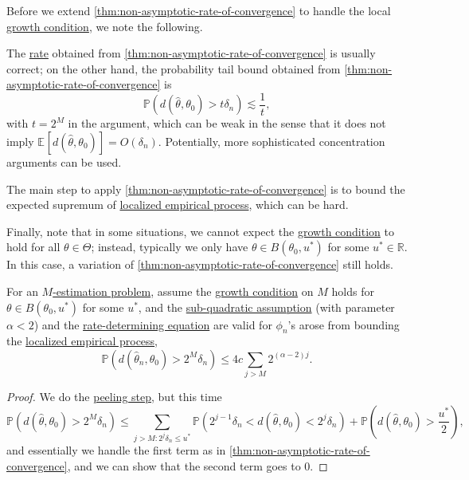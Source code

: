 Before we extend \autoref{thm:non-asymptotic-rate-of-convergence} to handle the local \hyperref[def:growth-condition*]{growth condition}, we note the following.

\begin{remark}
	The \hyperref[def:rate-of-convergence]{rate} obtained from \autoref{thm:non-asymptotic-rate-of-convergence} is usually correct; on the other hand, the probability tail bound obtained from \autoref{thm:non-asymptotic-rate-of-convergence} is
	\[
		\mathbb{P} (d(\hat{\theta} , \theta _0) > t \delta _n) \lesssim \frac{1}{t},
	\]
	with \(t = 2^M\) in the argument, which can be weak in the sense that it does not imply \(\mathbb{E}_{}[d(\hat{\theta} , \theta _0) ] = O(\delta _n)\). Potentially, more sophisticated concentration arguments can be used.
\end{remark}

\begin{remark}
	The main step  to apply \autoref{thm:non-asymptotic-rate-of-convergence} is to bound the expected supremum of \hyperref[def:localized-EP]{localized empirical process}, which can be hard.
\end{remark}

Finally, note that in some situations, we cannot expect the \hyperref[def:growth-condition*]{growth condition} to hold for all \(\theta \in \Theta \); instead, typically we only have \(\theta \in B(\theta _0, u^{\ast} )\) for some \(u^{\ast} \in \mathbb{R} \). In this case, a variation of \autoref{thm:non-asymptotic-rate-of-convergence} still holds.

\begin{theorem}\label{thm:non-asymptotic-rate-of-convergence-extend}
	For an \hyperref[prb:M-estimation]{\(M\)-estimation problem}, assume the \hyperref[def:growth-condition*]{growth condition} on \(M\) holds for \(\theta \in B(\theta _0, u^{\ast} )\) for some \(u^{\ast} \), and the \hyperref[def:sub-quadratic-assumption]{sub-quadratic assumption} (with parameter \(\alpha < 2\)) and the \hyperref[def:rate-determining-equation]{rate-determining equation} are valid for \(\phi _n\)'s arose from bounding the \hyperref[def:localized-EP]{localized empirical process},
	\[
		\mathbb{P} (d(\hat{\theta} _n, \theta _0) > 2^M \delta _n) \leq 4c \sum_{j > M} 2^{(\alpha -2) j}.
	\]
\end{theorem}
\begin{proof}
	We do the \hyperref[eq:peeling-step]{peeling step}, but this time
	\[
		\mathbb{P} (d(\hat{\theta} , \theta _0) > 2^M \delta _n)
		\leq \sum_{j > M\colon 2^j \delta _n \leq u^{\ast} } \mathbb{P} (2^{j-1} \delta _n < d(\hat{\theta} , \theta _0) < 2^j \delta _n) + \mathbb{P} \left( d(\hat{\theta} , \theta _0) > \frac{u^{\ast} }{2} \right),
	\]
	and essentially we handle the first term as in \autoref{thm:non-asymptotic-rate-of-convergence}, and we can show that the second term goes to \(0\).
\end{proof}

